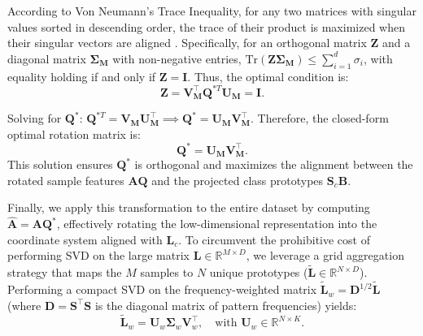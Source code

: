 According to Von Neumann's Trace Inequality, for any two matrices with singular values sorted in descending order, the trace of their product is maximized when their singular vectors are aligned \cite{vonNeumann1937}. Specifically, for an orthogonal matrix $\mathbf{Z}$ and a diagonal matrix $\mathbf{\Sigma}_{\mathbf{M}}$ with non-negative entries, $\text{Tr}(\mathbf{Z} \mathbf{\Sigma}_{\mathbf{M}}) \leq \sum_{i=1}^d \sigma_i$, with equality holding if and only if $\mathbf{Z} = \mathbf{I}$. Thus, the optimal condition is:
\begin{equation}
    \mathbf{Z} = \mathbf{V}_{\mathbf{M}}^\top \mathbf{Q}^{*T} \mathbf{U}_{\mathbf{M}} = \mathbf{I}.
\end{equation}

Solving for $\mathbf{Q}^*$: $\mathbf{Q}^{*T} = \mathbf{V}_{\mathbf{M}} \mathbf{U}_{\mathbf{M}}^\top \implies \mathbf{Q}^* = \mathbf{U}_{\mathbf{M}} \mathbf{V}_{\mathbf{M}}^\top.$
Therefore, the closed-form optimal rotation matrix is:
\begin{equation}
    \mathbf{Q}^* = \mathbf{U}_{\mathbf{M}} \mathbf{V}_{\mathbf{M}}^\top.
    \label{eq:optimal_Q}
\end{equation}
This solution ensures $\mathbf{Q}^*$ is orthogonal and maximizes the alignment between the rotated sample features $\mathbf{A}\mathbf{Q}$ and the projected class prototypes $\mathbf{S}_c \mathbf{B}$.

Finally, we apply this transformation to the entire dataset by computing $\hat{\mathbf{A}} = \mathbf{A} \mathbf{Q}^*$, effectively rotating the low-dimensional representation into the coordinate system aligned with $\mathbf{L}_c$. To circumvent the prohibitive cost of performing SVD on the large matrix $\mathbf{L} \in \mathbb{R}^{M \times D}$, we leverage a grid aggregation strategy that maps the $M$ samples to $N$ unique prototypes ($\tilde{\mathbf{L}} \in \mathbb{R}^{N \times D}$). Performing a compact SVD on the frequency-weighted matrix $\tilde{\mathbf{L}}_w = \mathbf{D}^{1/2}\tilde{\mathbf{L}}$ (where $\mathbf{D}=\mathbf{S}^\top\mathbf{S}$ is the diagonal matrix of pattern frequencies) yields:
\begin{equation}
    \tilde{\mathbf{L}}_w = \mathbf{U}_w \mathbf{\Sigma}_w \mathbf{V}_w^\top, \quad \text{with } \mathbf{U}_w \in \mathbb{R}^{N \times K}.
    \label{eq:svd_weighted}
\end{equation}

